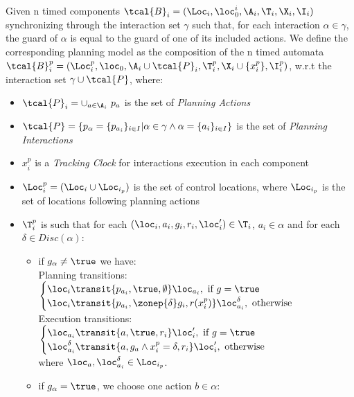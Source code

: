 \begin{definition}
  \label{def:plan_aut}
  Given n timed components $\tcal{B}_i=(\Loc_i,\loc_0^i,\A_i,\T_i,\X_i,\I_i)$ synchronizing through the interaction set  $\gamma$ such that,
  for each interaction $\alpha\in\gamma$, the guard of $\alpha$ is equal to the guard of one of its included actions.   
  We define the corresponding planning model as the composition of the n timed automata $\tcal{B}_i^p=(\Loc_i^p,\loc_0,\A_i\cup\tcal{P}_i,\T_i^p,\X_i\cup\{x_i^p\},\I_i^p)$,
  w.r.t the interaction set $\gamma\cup\tcal{P}$, where:
  \begin{itemize}
    \item $\tcal{P}_i=\cup_{a\in\A_i} \ p_{a}$ is the set of \emph{Planning Actions}
    \item $\tcal{P}=\{p_{\alpha}=\{p_{a_i}\}_{i\in I}|\alpha\in\gamma\wedge\alpha=\{a_i\}_{i\in I}\}$ is the set of \emph{Planning Interactions}  
    \item $x_i^p$ is a \emph{Tracking Clock} for interactions execution in each component
    \item $\Loc_i^{p}=(\Loc_i\cup\Loc_{i_p})$ is the set of control locations, where $\Loc_{i_p}$ is the set of locations 
      following planning actions
    \item $\T_i^p$ is such that for each $(\loc_i,a_i,g_i,r_i,\loc'_i)\in\T_i$, $a_i\in\alpha$ and for each
      $\delta\in Disc(\alpha)$:
      \begin{itemize}
        \item if $g_{\alpha}\neq\true$ we have:\\
          Planning transitions: $\begin{cases}
            \loc_i\transit{p_{a_i},\true,\emptyset}\loc_{a_i}, \text{ if } g=\true\\
          \loc_i\transit{p_{a_i},\zonep{\delta} g_i,r(x_i^p)}\loc^{\delta}_{a_i}, \text{ otherwise}\end{cases}$\\ 
          Execution transitions: $\begin{cases}
            \loc_{a_i}\transit{a,\true,r_i}\loc'_i, \text{ if } g=\true\\
            \loc_{a_i}^{\delta}\transit{a,g_a\wedge x_i^p=\delta,r_i}\loc'_i, \text{ otherwise}
            \end{cases}$\\
            where $\loc_{a},\loc_{a_i}^{\delta}\in\Loc_{i_p}$.\\
        \item if $g_{\alpha}=\true$, we choose one action $b\in\alpha$:\\

\end{itemize}
\end{itemize}
\end{definition}
